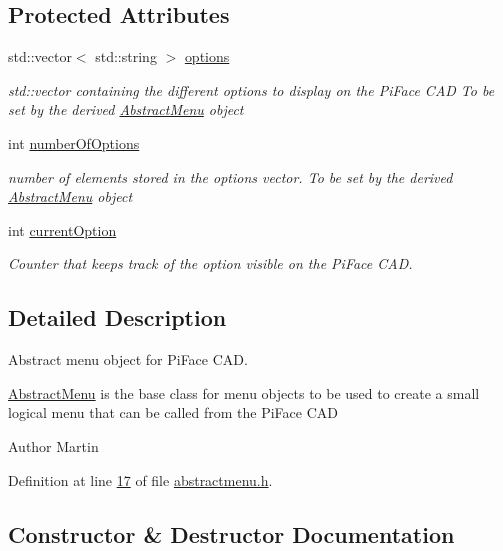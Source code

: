 \subsection*{Protected Attributes}
\begin{DoxyCompactItemize}
\item 
std\+::vector$<$ std\+::string $>$ \hyperlink{classAbstractMenu_a990dc4299fbe86152487fd35d46a403b}{options}
\begin{DoxyCompactList}\small\item\em std\+::vector containing the different options to display on the Pi\+Face C\+AD To be set by the derived \hyperlink{classAbstractMenu}{Abstract\+Menu} object \end{DoxyCompactList}\item 
int \hyperlink{classAbstractMenu_a6caff7f6281c6c2912e5f808c2906123}{number\+Of\+Options}
\begin{DoxyCompactList}\small\item\em number of elements stored in the options vector. To be set by the derived \hyperlink{classAbstractMenu}{Abstract\+Menu} object \end{DoxyCompactList}\item 
int \hyperlink{classAbstractMenu_a589fea1bf68c33e0eff64c8b609cb980}{current\+Option}
\begin{DoxyCompactList}\small\item\em Counter that keeps track of the option visible on the Pi\+Face C\+AD. \end{DoxyCompactList}\end{DoxyCompactItemize}


\subsection{Detailed Description}
Abstract menu object for Pi\+Face C\+AD. 

\hyperlink{classAbstractMenu}{Abstract\+Menu} is the base class for menu objects to be used to create a small logical menu that can be called from the Pi\+Face C\+AD

\begin{DoxyAuthor}{Author}
Martin 
\end{DoxyAuthor}


Definition at line \hyperlink{abstractmenu_8h_source_l00017}{17} of file \hyperlink{abstractmenu_8h_source}{abstractmenu.\+h}.



\subsection{Constructor \& Destructor Documentation}
